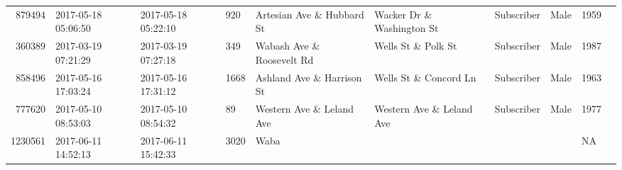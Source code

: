 \documentclass[11pt]{article}
\begin{document}
\begin{description}
\begin{tabular}{r|lllllllll}
	  879494                             & 2017-05-18 05:06:50                 & 2017-05-18 05:22:10                 &  920                                & Artesian Ave \& Hubbard St         & Wacker Dr \& Washington St         & Subscriber                          & Male                                & 1959                               \\
	  360389                             & 2017-03-19 07:21:29                 & 2017-03-19 07:27:18                 &  349                                & Wabash Ave \& Roosevelt Rd         & Wells St \& Polk St                & Subscriber                          & Male                                & 1987                               \\
	  858496                             & 2017-05-16 17:03:24                 & 2017-05-16 17:31:12                 & 1668                                & Ashland Ave \& Harrison St         & Wells St \& Concord Ln             & Subscriber                          & Male                                & 1963                               \\
	  777620                             & 2017-05-10 08:53:03                 & 2017-05-10 08:54:32                 &   89                                & Western Ave \& Leland Ave          & Western Ave \& Leland Ave          & Subscriber                          & Male                                & 1977                               \\
	 1230561                           & 2017-06-11 14:52:13               & 2017-06-11 15:42:33               & 3020                              & Waba                              &                                   &                                   &                                   &   NA                             \\
\end{tabular}


\end{description}
\end{document}
